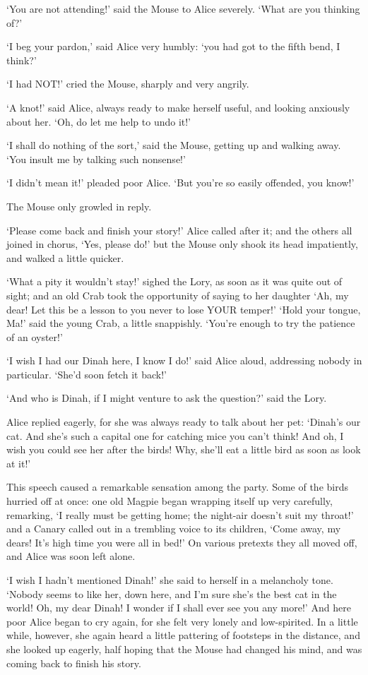 \documentclass[12pt]{article}
\begin{document}
\begin{Parallel}[p]{}{}
{‘You are not attending!’ said the Mouse to Alice severely. ‘What are you thinking of?’

‘I beg your pardon,’ said Alice very humbly: ‘you had got to the fifth bend, I think?’

‘I had NOT!’ cried the Mouse, sharply and very angrily.

‘A knot!’ said Alice, always ready to make herself useful, and looking anxiously about her. ‘Oh, do let me help to undo it!’

‘I shall do nothing of the sort,’ said the Mouse, getting up and walking away. ‘You insult me by talking such nonsense!’

‘I didn’t mean it!’ pleaded poor Alice. ‘But you’re so easily offended, you know!’

The Mouse only growled in reply.

‘Please come back and finish your story!’ Alice called after it; and the others all joined in chorus, ‘Yes, please do!’ but the Mouse only shook its head impatiently, and walked a little quicker.

‘What a pity it wouldn’t stay!’ sighed the Lory, as soon as it was quite out of sight; and an old Crab took the opportunity of saying to her daughter ‘Ah, my dear! Let this be a lesson to you never to lose YOUR temper!’ ‘Hold your tongue, Ma!’ said the young Crab, a little snappishly. ‘You’re enough to try the patience of an oyster!’

‘I wish I had our Dinah here, I know I do!’ said Alice aloud, addressing nobody in particular. ‘She’d soon fetch it back!’

‘And who is Dinah, if I might venture to ask the question?’ said the Lory.

Alice replied eagerly, for she was always ready to talk about her pet: ‘Dinah’s our cat. And she’s such a capital one for catching mice you can’t think! And oh, I wish you could see her after the birds! Why, she’ll eat a little bird as soon as look at it!’

This speech caused a remarkable sensation among the party. Some of the birds hurried off at once: one old Magpie began wrapping itself up very carefully, remarking, ‘I really must be getting home; the night-air doesn’t suit my throat!’ and a Canary called out in a trembling voice to its children, ‘Come away, my dears! It’s high time you were all in bed!’ On various pretexts they all moved off, and Alice was soon left alone.

‘I wish I hadn’t mentioned Dinah!’ she said to herself in a melancholy tone. ‘Nobody seems to like her, down here, and I’m sure she’s the best cat in the world! Oh, my dear Dinah! I wonder if I shall ever see you any more!’ And here poor Alice began to cry again, for she felt very lonely and low-spirited. In a little while, however, she again heard a little pattering of footsteps in the distance, and she looked up eagerly, half hoping that the Mouse had changed his mind, and was coming back to finish his story.




}
\end{Parallel}
\end{document}
